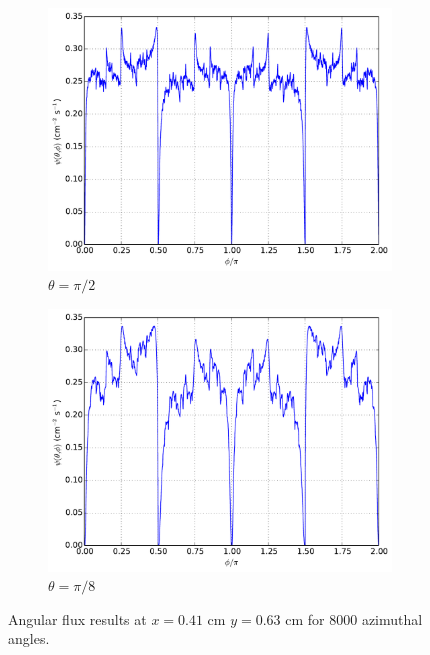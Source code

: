\documentclass[12pt]{article}
\newenvironment{solution}[1][Solution]{\begin{trivlist}
\item[\hskip \labelsep {\bfseries #1} {\hspace{-0.2em}\bfseries:}]\hspace{0.3in}\newline}{\end{trivlist}}
\begin{document}
\begin{solution}
\begin{figure}
\begin{subfigure}{0.5\textwidth}
\centering
\includegraphics[width=1.0\textwidth]{r4163pi2.pdf}
\caption{$\theta=\pi/2$}
    \end{subfigure}
    \begin{subfigure}{0.5\textwidth}
\centering
\includegraphics[width=1.0\textwidth]{r4163pi8.pdf}
\caption{$\theta=\pi/8$}
    \end{subfigure}
    \caption{Angular flux results at $x=0.41$ cm $y=0.63$ cm for 8000 azimuthal angles.}
\end{figure}
\begin{figure}
    \begin{subfigure}{0.5\textwidth}
\centering

\end{subfigure}
\end{figure}
\end{solution}
\end{document}
